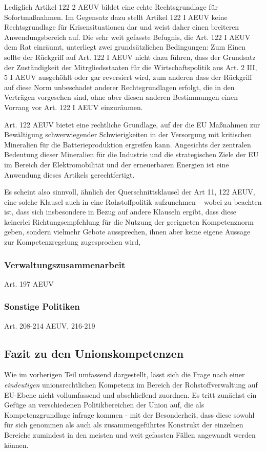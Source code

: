 \documentclass[12pt,a4paper,oneside]{book} %
\begin{document}
{	Lediglich Artikel 122 2 AEUV bildet eine echte Rechtsgrundlage für Sofortmaßnahmen. Im Gegensatz dazu stellt Artikel 122 I AEUV keine Rechtsgrundlage für Krisensituationen dar und weist daher einen breiteren Anwendungsbereich auf. Die sehr weit gefasste Befugnis, die Art. 122 I AEUV dem Rat einräumt, unterliegt zwei grundsätzlichen Bedingungen: Zum Einen sollte der Rückgriff auf Art. 122 I AEUV nicht dazu führen, dass der Grundsatz der Zuständigkeit der Mitrgliedsstaaten für die Wirtschaftspolitik aus Art. 2 III, 5 I AEUV ausgehöhlt oder gar reversiert wird, zum anderen dass der Rückgriff auf diese Norm unbeschadet anderer Rechtsgrundlagen erfolgt, die in den Verträgen vorgesehen sind, ohne aber diesen anderen Bestimmungen einen Vorrang vor Art. 122 I AEUV einzuräumen.\autocite{chamon_anwendung_2023}
	
	Art. 122 AEUV bietet eine rechtliche Grundlage, auf der die EU Maßnahmen zur Bewältigung schwerwiegender Schwierigkeiten in der Versorgung mit kritischen Mineralien für die Batterieproduktion ergreifen kann. Angesichts der zentralen Bedeutung dieser Mineralien für die Industrie und die strategischen Ziele der EU im Bereich der Elektromobilität und der erneuerbaren Energien ist eine Anwendung dieses Artikels gerechtfertigt.
	
	Es scheint also sinnvoll, ähnlich der Querschnittsklausel der Art 11, 122 AEUV, eine solche Klausel auch in eine Rohstoffpolitik aufzunehmen -- wobei zu beachten ist, dass sich insbesondere in Bezug auf andere Klauseln ergibt, dass diese keinerlei Richtungsempfehlung für die Nutzung der geeigneten Kompetenznorm geben, sondern vielmehr Gebote aussprechen, ihnen aber keine eigene Aussage zur Kompetenzregelung zugesprochen wird,\autocite[39]{callies_umweltrecht_2022}
	
	
	\subsubsection{Verwaltungszusammenarbeit}
	Art. 197 AEUV
	
	\subsubsection{Sonstige Politiken}
	Art. 208-214 AEUV, 216-219
	
	\subsection{Fazit zu den Unionskompetenzen}
	Wie im vorherigen Teil umfassend dargestellt, lässt sich die Frage nach einer \textit{eindeutigen} unionsrechtlichen Kompetenz im Bereich der Rohstoffverwaltung auf EU-Ebene nicht vollumfassend und abschließend zuordnen. Es tritt zunächst ein Gefüge an verschiedenen Politikbereichen der Union auf, die als Kompetenzgrundlage infrage kommen - mit der Besonderheit, dass diese sowohl für sich genommen als auch als zusammengeführtes Konstrukt der einzelnen Bereiche zumindest in den meisten und weit gefassten Fällen angewandt werden können.
	
}
\end{document}

